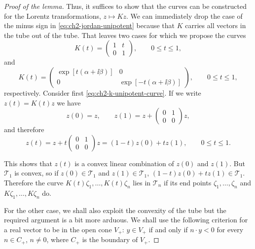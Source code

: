 \begin{proof}[Proof of the lemma]
Thus, it suffices to show that the curves can be constructed for the Lorentz
transformations, $z\longmapsto Kz$.  We can immediately drop the case of the
minus sign in \eqref{eq:ch2-jordan-unipotent} because that $K$ carries all vectors in the tube out of
the tube.  That leaves two cases for which we propose the curves
\begin{equation}
  K(t)=\begin{pmatrix}1&t\\[2pt]0&1\end{pmatrix},
  \qquad 0\leq t\leq1 ,
  \tag{2-89}\label{eq:ch2-k-unipotent-curve}
\end{equation}
and
\begin{equation}
  K(t)=\begin{pmatrix}
    \exp[t(\alpha+\ii\beta)]&0\\[2pt]
    0&\exp[-t(\alpha+\ii\beta)]
  \end{pmatrix},
  \qquad 0\leq t\leq1 ,
  \tag{2-90}\label{eq:ch2-k-diagonal-curve}
\end{equation}
respectively.  Consider first \eqref{eq:ch2-k-unipotent-curve}.  If we write $z(t)=K(t)z$ we have
\begin{equation*}
  z(0)=z,\qquad
  z(1)=z+\begin{pmatrix}0&1\\[2pt]0&0\end{pmatrix}z,
\end{equation*}
and therefore
\begin{equation*}
  z(t)=z+t\begin{pmatrix}0&1\\[2pt]0&0\end{pmatrix}z
  =(1-t)z(0)+tz(1),\qquad 0\leq t\leq1 .
\end{equation*}

This shows that $z(t)$ is a convex linear combination of $z(0)$ and $z(1)$.
But $\mathcal{T}_{1}$ is convex, so if $z(0)\in\mathcal{T}_{1}$ and
$z(1)\in\mathcal{T}_{1}$, $(1-t)z(0)+tz(1)\in\mathcal{T}_{1}$.  Therefore
the curve $K(t)\zeta_1,\ldots,K(t)\zeta_n$ lies in $\mathcal{T}_{n}$ if its
end points $\zeta_1,\ldots,\zeta_n$ and $K\zeta_1,\ldots,K\zeta_n$ do.

For the other case, we shall also exploit the convexity of the tube but the
required argument is a bit more arduous.  We shall use the following criterion
for a real vector to be in the open cone $V_{+}$: $y\in V_{+}$ if and only if
$n\mathbin{\cdot}y<0$ for every $n\in C_{+}$, $n\neq0$, where $C_{+}$ is the
boundary of $V_{+}$.


\end{proof}

